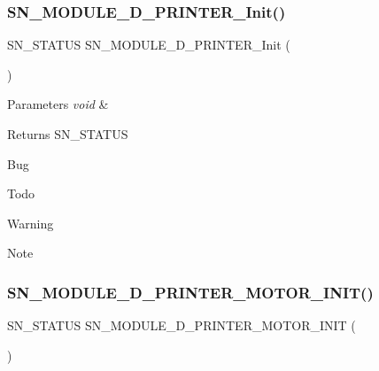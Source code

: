 \subsubsection{\texorpdfstring{S\+N\+\_\+\+M\+O\+D\+U\+L\+E\+\_\+D\+\_\+\+P\+R\+I\+N\+T\+E\+R\+\_\+\+Init()}{SN\_MODULE\_3D\_PRINTER\_Init()}}
{\footnotesize\ttfamily S\+N\+\_\+\+S\+T\+A\+T\+US S\+N\+\_\+\+M\+O\+D\+U\+L\+E\+\_\+D\+\_\+\+P\+R\+I\+N\+T\+E\+R\+\_\+\+Init (\begin{DoxyParamCaption}\item[{void}]{ }\end{DoxyParamCaption})}


\begin{DoxyParams}{Parameters}
{\em void} & \\
\hline
\end{DoxyParams}
\begin{DoxyReturn}{Returns}
S\+N\+\_\+\+S\+T\+A\+T\+US 
\end{DoxyReturn}
\begin{DoxyRefDesc}{Bug}
\item[\hyperlink{bug__bug000002}{Bug}]\end{DoxyRefDesc}
\begin{DoxyRefDesc}{Todo}
\item[\hyperlink{todo__todo000002}{Todo}]\end{DoxyRefDesc}
\begin{DoxyWarning}{Warning}

\end{DoxyWarning}
\begin{DoxyNote}{Note}

\end{DoxyNote}
\mbox{\label{group__Module_gafc569784fa8758bec7c2f90b1a7f1404}} 
\subsubsection{\texorpdfstring{S\+N\+\_\+\+M\+O\+D\+U\+L\+E\+\_\+D\+\_\+\+P\+R\+I\+N\+T\+E\+R\+\_\+\+M\+O\+T\+O\+R\+\_\+\+I\+N\+I\+T()}{SN\_MODULE\_3D\_PRINTER\_MOTOR\_INIT()}}
{\footnotesize\ttfamily S\+N\+\_\+\+S\+T\+A\+T\+US S\+N\+\_\+\+M\+O\+D\+U\+L\+E\+\_\+D\+\_\+\+P\+R\+I\+N\+T\+E\+R\+\_\+\+M\+O\+T\+O\+R\+\_\+\+I\+N\+IT (\begin{DoxyParamCaption}\item[{void}]{ }\end{DoxyParamCaption})}


